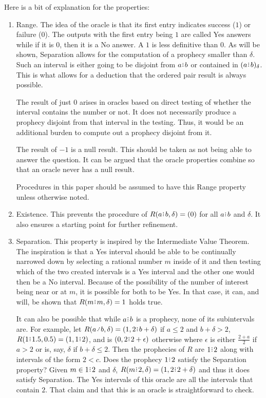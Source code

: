 \documentclass[12pt]{article}
\begin{document}
Here is a bit of explanation for the properties: 
\begin{enumerate}
    \item Range. The idea of the oracle is that its first entry indicates success ($1$) or failure ($0$). The outputs with the first entry being $1$ are called Yes answers while if it is $0$, then it is a No answer. A $1$ is less definitive than $0$. As will be shown, Separation allows for the computation of a prophecy smaller than $\delta$. Such an interval is either going to be disjoint from $a \rint b$ or contained in $\halo{a\rint b}$. This is what allows for a deduction that the ordered pair result is always possible. 

    The result of just $0$ arises in oracles based on direct testing of whether the interval contains the number or not. It does not necessarily produce a prophecy disjoint from that interval in the testing. Thus, it would be an additional burden to compute out a prophecy disjoint from it. 

    The result of $-1$ is a null result. This should be taken as not being able to answer the question. It can be argued that the oracle properties combine so that an oracle never has a null result. 

    Procedures in this paper should be assumed to have this Range property unless otherwise noted. 

    \item Existence. This prevents the procedure of $R(a\rint b, \delta) = (0)$ for all $a\rint b$ and $\delta$. It also ensures a starting point for further refinement. 

    \item Separation. This property is inspired by the Intermediate Value Theorem. The inspiration is that a Yes interval should be able to be continually narrowed down by selecting a rational number $m$ inside of it and then testing which of the two created intervals is a Yes interval and the other one would then be a No interval. Because of the possibility of the number of interest being near or at $m$, it is possible for both to be Yes. In that case, it can, and will, be shown that $R(m\rint m, \delta) = 1$ holds true. 
    
    It can also be possible that while $a\rint b$ is a prophecy, none of its subintervals are. For example, let $R(a \lte  b, \delta) = (1, 2\rint  b+ \delta)$ if $a \leq 2$ and $b + \delta > 2$,  $R(1\rint 1.5, 0.5) = (1, 1\rint 2)$, and is $(0, 2\rint 2+\epsilon)$ otherwise where $\epsilon$ is either $\frac{2+a}{2}$ if $a > 2$ or is, say, $\delta$ if $b+\delta \leq 2$. Then the prophecies of $R$ are  $1\rint 2$ along with intervals of the form $2 \lt  c$. Does the prophecy $1\rint 2$ satisfy the Separation property? Given $m \in 1\rint 2$ and $\delta$, $R(m \rint 2, \delta) = (1, 2\rint 2+\delta)$ and thus it does satisfy Separation. The Yes intervals of this oracle are all the intervals that contain $2$. That claim and that this is an oracle is straightforward to check.  
    

\end{enumerate}
\end{document}
